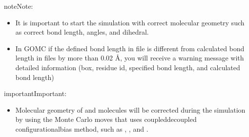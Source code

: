 \documentclass[letterpaper,10pt,english]{sphinxmanual}
\begin{document}
\begin{sphinxadmonition}{note}{Note:}\begin{itemize}
\item {} 
\sphinxAtStartPar
It is important to start the simulation with correct molecular geometry such as correct bond length, angles, and dihedral.

\item {} 
\sphinxAtStartPar
In GOMC if the defined bond length in  file is different from calculated bond length in  files by more than 0.02 \(Å\), you will receive a warning message with detailed information (box, residue id, specified bond length, and calculated bond length)

\end{itemize}
\end{sphinxadmonition}

\begin{sphinxadmonition}{important}{Important:}\begin{itemize}
\item {} 
\sphinxAtStartPar
Molecular geometry of  and  molecules will be corrected during the simulation by using the Monte Carlo moves that uses coupled\sphinxhyphen{}decoupled configurational\sphinxhyphen{}bias method, such as , , and .

\end{itemize}
\end{sphinxadmonition}
\end{document}
